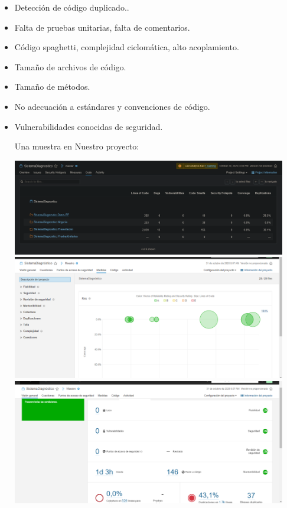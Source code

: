 \documentclass[preprint,12pt]{elsarticle}
\begin{document}
\begin{itemize}
	\item Detección de código duplicado..
	\item Falta de pruebas unitarias, falta de comentarios. 
	\item Código spaghetti, complejidad ciclomática, alto acoplamiento.
	\item Tamaño de archivos de código.
	\item Tamaño de métodos.
	\item No adecuación a estándares y convenciones de código.
	\item Vulnerabilidades conocidas de seguridad.
	
	Una muestra en Nuestro proyecto:
		
\begin{center}
	\includegraphics[width=12cm]{./imagen/Screenshot_2020-10-30 Code.png}
	\includegraphics[width=12cm]{./imagen/foto1.png}
	\includegraphics[width=12cm]{./imagen/foto2.png} 
\end{center}

\end{itemize}
\end{document}
